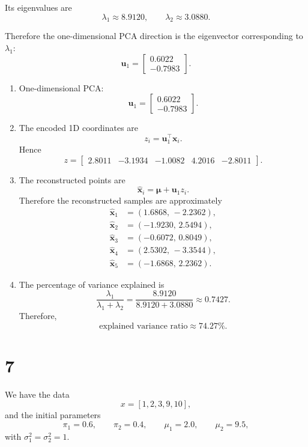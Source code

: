 \documentclass[11pt]{article}
\begin{document}
Its eigenvalues are
\[
\lambda_1\approx 8.9120,\qquad \lambda_2\approx 3.0880.
\]

Therefore the one-dimensional PCA direction is the eigenvector corresponding to \(\lambda_1\):
\[
\boxed{
\bm{u}_1=
\begin{bmatrix}
0.6022\\
-0.7983
\end{bmatrix}.}
\]

\begin{enumerate}[label=\alph*)]
\item One-dimensional PCA:
\[
\boxed{\bm{u}_1=\begin{bmatrix}0.6022\\-0.7983\end{bmatrix}.}
\]

\item The encoded 1D coordinates are
\[
z_i=\bm{u}_1^{\top}\bm{x}_i.
\]
Hence
\[
\boxed{
z=
\begin{bmatrix}
2.8011 & -3.1934 & -1.0082 & 4.2016 & -2.8011
\end{bmatrix}.}
\]

\item The reconstructed points are
\[
\hat{\bm{x}}_i=\bm{\mu}+\bm{u}_1 z_i.
\]
Therefore the reconstructed samples are approximately
\[
\boxed{
\begin{aligned}
\hat{\bm{x}}_1&=(1.6868,\,-2.2362),\\
\hat{\bm{x}}_2&=(-1.9230,\,2.5494),\\
\hat{\bm{x}}_3&=(-0.6072,\,0.8049),\\
\hat{\bm{x}}_4&=(2.5302,\,-3.3544),\\
\hat{\bm{x}}_5&=(-1.6868,\,2.2362).
\end{aligned}}
\]

\item The percentage of variance explained is
\[
\frac{\lambda_1}{\lambda_1+\lambda_2}
=
\frac{8.9120}{8.9120+3.0880}
\approx 0.7427.
\]
Therefore,
\[
\boxed{\text{explained variance ratio} \approx 74.27\%.}
\]
\end{enumerate}

\section*{7}

We have the data
\[
x=[1,2,3,9,10],
\]
and the initial parameters
\[
\pi_1=0.6,\qquad \pi_2=0.4,\qquad \mu_1=2.0,\qquad \mu_2=9.5,
\]
with \(\sigma_1^2=\sigma_2^2=1\).
\end{document}
